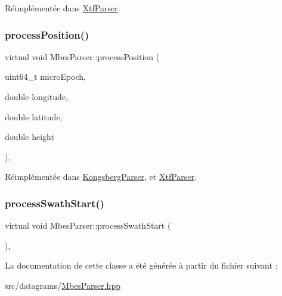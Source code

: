 Réimplémentée dans \hyperlink{classXtfParser_ae8932c52b4030f14acd8b4419037c3eb}{Xtf\+Parser}.

\mbox{\label{classMbesParser_add86a02726482d3a8e2a8aaf7f4beefa}} 
\subsubsection{\texorpdfstring{process\+Position()}{processPosition()}}
{\footnotesize\ttfamily virtual void Mbes\+Parser\+::process\+Position (\begin{DoxyParamCaption}\item[{uint64\+\_\+t}]{micro\+Epoch,  }\item[{double}]{longitude,  }\item[{double}]{latitude,  }\item[{double}]{height }\end{DoxyParamCaption})\hspace{0.3cm}{\ttfamily [inline]}, {\ttfamily [virtual]}}



Réimplémentée dans \hyperlink{classKongsbergParser_a692580461f3e6d8f822cb84cf3ed6a3c}{Kongsberg\+Parser}, et \hyperlink{classXtfParser_abbb02ef84a6f01696fb1f6ed23d2bb5f}{Xtf\+Parser}.

\mbox{\label{classMbesParser_ab6481abeb95b37b435a3bf2d705eba19}} 
\subsubsection{\texorpdfstring{process\+Swath\+Start()}{processSwathStart()}}
{\footnotesize\ttfamily virtual void Mbes\+Parser\+::process\+Swath\+Start (\begin{DoxyParamCaption}{ }\end{DoxyParamCaption})\hspace{0.3cm}{\ttfamily [inline]}, {\ttfamily [virtual]}}



La documentation de cette classe a été générée à partir du fichier suivant \+:\begin{DoxyCompactItemize}
\item 
src/datagrams/\hyperlink{MbesParser_8hpp}{Mbes\+Parser.\+hpp}\end{DoxyCompactItemize}
